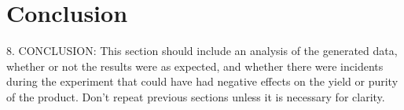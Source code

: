 \documentclass[letterpaper,amsmath,amssymb,prb,preprint,12pt]{revtex4-1}%
\begin{document}
\section{Conclusion}


8. CONCLUSION: This section should include an analysis of the generated data,
whether or not the results were as expected, and whether there were incidents during
the experiment that could have had negative effects on the yield or purity of the
product. Don’t repeat previous sections unless it is necessary for clarity.


% 
% 
\end{document}

